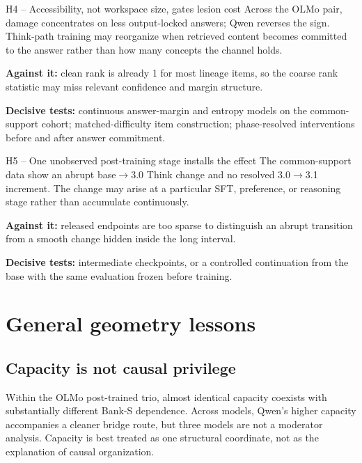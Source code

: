 \documentclass[11pt]{article}
\begin{document}
\begin{hypbox}{H4 -- Accessibility, not workspace size, gates lesion cost}
Across the OLMo pair, damage concentrates on less output-locked answers;
Qwen reverses the sign. Think-path training may reorganize when retrieved
content becomes committed to the answer rather than how many concepts the
channel holds.

\textbf{Against it:} clean rank is already 1 for most lineage items, so the
coarse rank statistic may miss relevant confidence and margin structure.

\textbf{Decisive tests:} continuous answer-margin and entropy models on the
common-support cohort; matched-difficulty item construction; phase-resolved
interventions before and after answer commitment.
\end{hypbox}

\begin{hypbox}{H5 -- One unobserved post-training stage installs the effect}
The common-support data show an abrupt base$\to$3.0 Think change and no
resolved 3.0$\to$3.1 increment. The change may arise at a particular SFT,
preference, or reasoning stage rather than accumulate continuously.

\textbf{Against it:} released endpoints are too sparse to distinguish an
abrupt transition from a smooth change hidden inside the long interval.

\textbf{Decisive tests:} intermediate checkpoints, or a controlled
continuation from the base with the same evaluation frozen before training.
\end{hypbox}

\section{General geometry lessons}\label{sec:geometry}

\subsection{Capacity is not causal privilege}

Within the OLMo post-trained trio, almost identical capacity coexists with
substantially different Bank-S dependence. Across models, Qwen's higher
capacity accompanies a cleaner bridge route, but three models are not a
moderator analysis. Capacity is best treated as one structural coordinate,
not as the explanation of causal organization.
\end{document}
